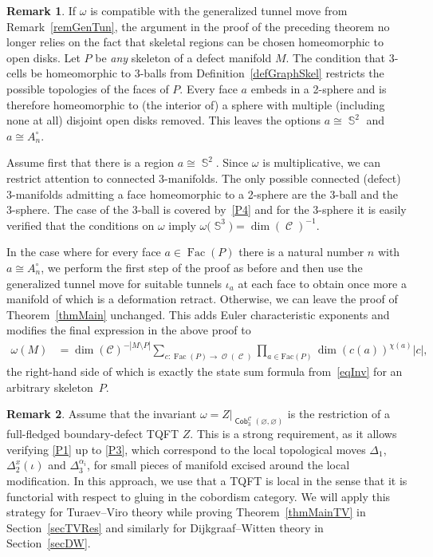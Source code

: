 \documentclass[pdftex]{sigma}
\DeclareMathOperator{\Sp}{\mathbb{S}}
\DeclareMathOperator{\Cob}{\mathsf{Cob}}
\DeclareMathOperator{\calc}{\mathcal{C}}
\DeclareMathOperator{\calo}{\mathcal{O}}
\DeclareMathOperator{\Fac}{\mathrm{Fac}}
\numberwithin{equation}{section}
\theoremstyle{definition}
\newtheorem{Remark}[Remark]{Remark}
\begin{document}
\begin{Remark} \label{remSkelTun}
 If $\omega$ is compatible with the generalized tunnel move from Remark~\ref{remGenTun}, the argument in the proof of the preceding theorem no longer relies on the fact that skeletal regions can be chosen homeomorphic to open disks. Let $P$ be \textit{any} skeleton of a defect manifold $M$. The condition that 3-cells be homeomorphic to 3-balls from Definition~\ref{defGraphSkel} restricts the possible topologies of the faces of $P$. Every face $a$ embeds in a 2-sphere and is therefore homeomorphic to (the interior of) a sphere with multiple (including none at all) disjoint open disks removed. This leaves the options $a \cong \Sp^2$ and $a \cong A_n^{\circ}$.

 Assume first that there is a region $a \cong \Sp^2$. Since $\omega$ is multiplicative, we can restrict attention to connected 3-manifolds. The only possible connected (defect) 3-manifolds admitting a face homeomorphic to a 2-sphere are the 3-ball and the 3-sphere. The case of the 3-ball is covered by~\ref{P4} and for the 3-sphere it is easily verified that the conditions on $\omega$ imply $\omega\bigl(\Sp^3\bigr) = \dim(\calc)^{-1}$.

 In the case where for every face $a \in \Fac(P)$ there is a natural number $n$ with $a \cong A_n^{\circ}$, we perform the first step of the proof as before and then use the generalized tunnel move  for suitable tunnels $\iota_a$ at each face to obtain once more a manifold of which  is a deformation retract. Otherwise, we can leave the proof of Theorem~\ref{thmMain} unchanged. This adds Euler characteristic exponents and modifies the final expression in the above proof to
 \begin{align*}
 \omega(M) &= \dim(\mathcal{C})^{-|M\setminus P|}\sum_{c\colon \Fac(P) \rightarrow \calo(\calc)} \prod_{a \in \mathrm{Fac}(P)}\dim(c(a))^{\chi(a)} |c|,
 \end{align*}
 the right-hand side of which is exactly the state sum formula from~\eqref{eqInv} for an arbitrary skeleton~$P$.
\end{Remark}

\begin{Remark}
 Assume that the invariant $\omega = Z|_{\Cob_3^{\calc}(\varnothing, \varnothing)}$ is the restriction of a full-fledged boundary-defect TQFT $Z$. This is a strong requirement, as it allows verifying \ref{P1} up to \ref{P3}, which correspond to the local topological moves $\Delta_1$, $\Delta_2^x(\iota)$ and $\Delta_3^{\alpha_i}$, for small pieces of manifold excised around the local modification. In this approach, we use that a TQFT is local in the sense that it is functorial with respect to gluing in the cobordism category. We will apply this strategy for Turaev--Viro theory while proving Theorem~\ref{thmMainTV} in Section~\ref{secTVRes} and similarly for Dijkgraaf--Witten theory in Section~\ref{secDW}.
\end{Remark}
\end{document}
